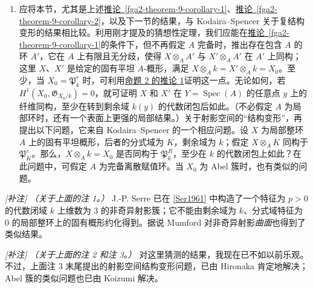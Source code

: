 \begin{remarks}{}
\begin{enumerate}
    \item{}应将本节，尤其是上述\hyperref[fga2-theorem-9-corollary-1]{推论~\ref*{fga2-theorem-9-corollary-1}}、\hyperref[fga2-theorem-9-corollary-2]{推论~\ref*{fga2-theorem-9-corollary-2}}，以及下一节的结果，与 Kodaira–Spencer 关于复结构变形的结果相比较。利用刚才提及的猜想性定理，我们应能在\hyperref[fga2-theorem-9-corollary-1]{推论~\ref*{fga2-theorem-9-corollary-1}}的条件下，但不再假定 \(A\) 完备时，推出存在包含 \(A\) 的环 \(A'\)，它在 \(A\) 上有限且无分歧，使得 \(X\otimes _AA'\) 与 \(X'\otimes _AA'\) 在 \(A'\) 上同构；这里 \(X\)、\(X'\) 是给定的固有平坦 \(A\)-概形，满足 \(X\otimes _Ak=X'\otimes _Ak=X_0\)。至少，当 \(X_0=\mathfrak {P}_k^r\) 时，可利用\hyperref[fga2-proposition-2-corollary-1]{命题 2 的推论 1}证明这一点。无论如何，若 \(H^1(X_0,\mathfrak {G}_{X_0/k})=0\)，就可证明 \(X\) 和 \(X'\) 在 \(Y=\operatorname {Spec}(A)\) 的任意点 \(y\) 上的纤维同构，至少在转到剩余域 \(k(y)\) 的代数闭包后如此。（不必假定 \(A\) 为局部环时，还有一个表面上更强的局部结果。）关于射影空间的“结构变形”，再提出以下问题，它来自 Kodaira–Spencer 的一个相应问题。设 \(X\) 为局部整环 \(A\) 上的固有平坦概形，后者的分式域为 \(K\)，剩余域为 \(k\)；假定 \(X\otimes _AK\) 同构于 \(\mathfrak {P}_K^r\)。那么，\(X\otimes _Ak=X_0\) 是否同构于 \(\mathfrak {P}_k^R\)，至少在 \(k\) 的代数闭包上如此？在此问题中，可假定 \(A\) 为完备离散赋值环。当 \(X_0\) 为 Abel 簇时，也有类似的问题。\end{enumerate}\end{remarks}
\begin{remark}{}\label{fga2-6-remark-i}\skipsinglepar
\par{}\emph{[补注]} \emph{（关于上面的注 1。）} J.-P. Serre 已在 \hyperref[Ser1961]{[Ser1961]} 中构造了一个特征为 \(p>0\) 的代数闭域 \(k\) 上维数为 \(3\) 的非奇异射影簇；它不能由剩余域为 \(k\)、分式域特征为 \(0\) 的局部整环上的固有概形约化得到。据说 Mumford 对非奇异射影\emph{曲面}也得到了类似结果。\end{remark}
\begin{remark}{}\label{fga2-6-remark-ii}\skipsinglepar
\par{}\emph{[补注]} \emph{（关于上面的注 2 和注 3。）} 对这里猜测的结果，我现在已不如以前乐观。不过，上面注 3 末尾提出的射影空间结构变形问题，已由 Hironaka 肯定地解决；Abel 簇的类似问题也已由 Koizumi 解决。\end{remark}

